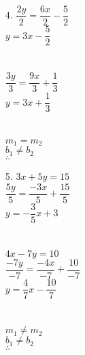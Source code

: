
\begin{enumerate}[label = \arabic*. ]

\item[4. ] $\dfrac{2y}{2} = \dfrac{6x}{2}   - \dfrac{5}{2} $\redcheck \\
$y = 3x - \dfrac{5}{2} $\redcheck \\
\redcheck \\
\redcheck \\
$\dfrac{3y}{3} = \dfrac{9x}{3} + \dfrac{1}{3} $\redcheck \\
$y = 3x + \dfrac{1}{3} $\redcheck \\
\redcheck \\
\redcheck \\
$m_1 = m_2$\redcheck \\
$b_1 \neq b_2$\redcheck \\
$\therefore$  \redcheck
\vspce 

\item[5. ] $3x + 5y=15 $ \redcheck \\
$\dfrac{5y}{5} =\dfrac{-3x}{5} + \dfrac{15}{5}  $ \redcheck \\
$y =-\dfrac{3}{5}x + 3$ \redcheck \\
\redcheck \\
\redcheck \\

$4x - 7y = 10$\redcheck \\
$\dfrac{- 7y}{-7}  =\dfrac{-4x}{-7} +\dfrac{10}{-7} $\redcheck \\
$y=\dfrac{4}{7}x -\dfrac{10}{7} $\redcheck \\
\redcheck \\
\redcheck \\
$m_1 \neq m_2$\redcheck \\
$b_1 \neq b_2$\redcheck \\
$\therefore$  \redcheck
\end{enumerate} 